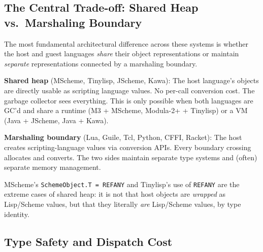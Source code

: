 \documentclass[11pt]{article}
\begin{document}
\subsection{The Central Trade-off: Shared Heap vs.\ Marshaling Boundary}
\label{sec:shared-heap}

The most fundamental architectural difference across these systems is
whether the host and guest languages \emph{share} their object
representations or maintain \emph{separate} representations connected
by a marshaling boundary.

\textbf{Shared heap} (MScheme, Tinylisp, JScheme, Kawa): The host
language's objects are directly usable as scripting language values.
No per-call conversion cost.  The garbage collector sees everything.
This is only possible when both languages are GC'd and share a runtime
(M3 + MScheme, Modula-2+ + Tinylisp) or a VM (Java + JScheme, Java +
Kawa).

\textbf{Marshaling boundary} (Lua, Guile, Tcl, Python, CFFI, Racket):
The host creates scripting-language values via conversion APIs.  Every
boundary crossing allocates and converts.  The two sides maintain
separate type systems and (often) separate memory management.

MScheme's \texttt{SchemeObject.T = REFANY} and Tinylisp's use of
\texttt{REFANY} are the extreme cases of shared heap: it is not that
host objects are \emph{wrapped} as Lisp/Scheme values, but that they
literally \emph{are} Lisp/Scheme values, by type identity.


\subsection{Type Safety and Dispatch Cost}
\label{sec:type-safety}
\end{document}
